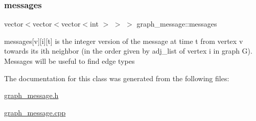 \mbox{\label{classgraph__message_aac77e098f0acf9650116a8e51fe3b4b7}} 
\subsubsection{\texorpdfstring{messages}{messages}}
{\footnotesize\ttfamily vector$<$vector$<$vector$<$int $>$ $>$ $>$ graph\+\_\+message\+::messages}



messages\mbox{[}v\mbox{]}\mbox{[}i\mbox{]}\mbox{[}t\mbox{]} is the integer version of the message at time t from vertex v towards its ith neighbor (in the order given by adj\+\_\+list of vertex i in graph G). Messages will be useful to find edge types 



The documentation for this class was generated from the following files\+:\begin{DoxyCompactItemize}
\item 
\hyperlink{graph__message_8h}{graph\+\_\+message.\+h}\item 
\hyperlink{graph__message_8cpp}{graph\+\_\+message.\+cpp}\end{DoxyCompactItemize}
